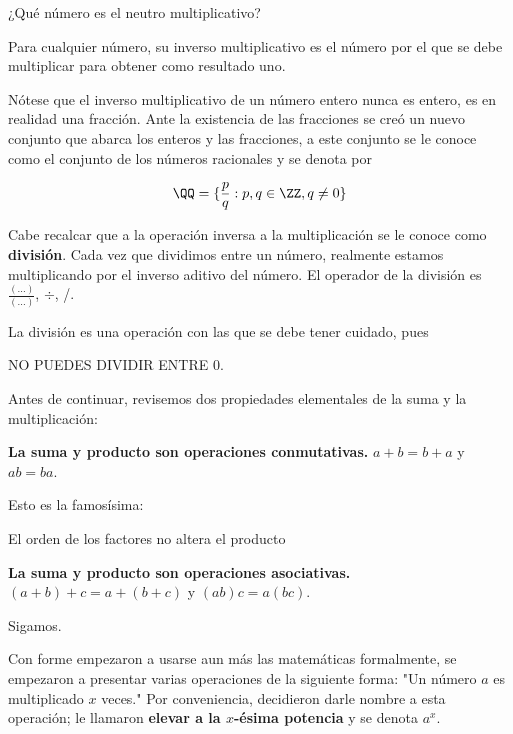 \begin{question}
    ¿Qué número es el neutro multiplicativo?
\end{question}

\begin{definition}
    Para cualquier número, su inverso multiplicativo es el 
    número por el que se debe multiplicar para obtener como 
    resultado uno.
\end{definition}

Nótese que el inverso multiplicativo de un número entero 
nunca es entero, es en realidad una fracción. Ante la 
existencia de las fracciones se creó un nuevo conjunto 
que abarca los enteros y las fracciones, a este conjunto 
se le conoce como el conjunto de los números racionales y 
se denota por 

\[\QQ = \{\frac{p}{q}:p,q \in \ZZ, q \neq 0\} \]

Cabe recalcar que a la operación inversa a la multiplicación se le conoce 
como \textbf{división}. Cada vez que dividimos entre un número, 
realmente estamos multiplicando por el inverso aditivo del número. 
El operador de la división es $\frac{(...)}{(...)}$, $\div$, /.

La división es una operación con las que se debe tener cuidado, 
pues 

\begin{moral}
    NO PUEDES DIVIDIR ENTRE $0$.
\end{moral}

Antes de continuar, revisemos dos propiedades elementales 
de la suma y la multiplicación:

\textbf{La suma y producto son operaciones conmutativas.} 
$a+b=b+a$ y $ab=ba$.

Esto es la famosísima:

\begin{moral}
    El orden de los factores no altera el producto
\end{moral}

\textbf{La suma y producto son operaciones asociativas.} 
$(a+b)+c=a+(b+c)$ y $(ab)c=a(bc)$.

Sigamos.

Con forme empezaron a usarse aun más las matemáticas formalmente, 
se empezaron a presentar varias operaciones de la siguiente forma: 
"Un número $a$ es multiplicado $x$ veces." Por conveniencia, 
decidieron darle nombre a esta operación; le llamaron 
\textbf{elevar a la $x$-ésima potencia} y se denota $a^x$.

